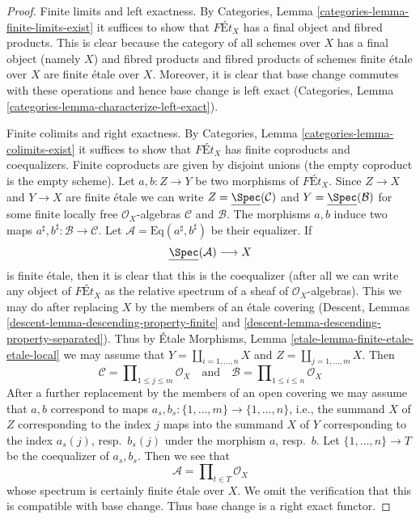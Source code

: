 \begin{proof}
Finite limits and left exactness. By
Categories, Lemma \ref{categories-lemma-finite-limits-exist}
it suffices to show that $\textit{F\'Et}_X$ has a final object
and fibred products. This is clear because the category of
all schemes over $X$ has a final object (namely $X$) and fibred products
and fibred products of schemes finite \'etale over $X$ are
finite \'etale over $X$. Moreover, it is clear that base
change commutes with these operations and hence base change
is left exact (Categories, Lemma
\ref{categories-lemma-characterize-left-exact}).

\medskip\noindent
Finite colimits and right exactness. By
Categories, Lemma \ref{categories-lemma-colimits-exist}
it suffices to show that $\textit{F\'Et}_X$ has finite
coproducts and coequalizers. Finite coproducts are given
by disjoint unions (the empty coproduct is the empty scheme).
Let $a, b : Z \to Y$ be two morphisms of $\textit{F\'Et}_X$.
Since $Z \to X$ and $Y \to X$ are finite \'etale we can write
$Z = \underline{\Spec}(\mathcal{C})$ and $Y = \underline{\Spec}(\mathcal{B})$
for some finite locally free $\mathcal{O}_X$-algebras $\mathcal{C}$
and $\mathcal{B}$. The morphisms $a, b$ induce two maps
$a^\sharp, b^\sharp : \mathcal{B} \to \mathcal{C}$.
Let $\mathcal{A} = \text{Eq}(a^\sharp, b^\sharp)$ be their
equalizer. If
$$
\underline{\Spec}(\mathcal{A}) \longrightarrow X
$$
is finite \'etale, then it is clear that this is the coequalizer
(after all we can write any object of $\textit{F\'Et}_X$
as the relative spectrum of a sheaf of $\mathcal{O}_X$-algebras).
This we may do after replacing $X$ by the members of an \'etale
covering (Descent, Lemmas \ref{descent-lemma-descending-property-finite}
and \ref{descent-lemma-descending-property-separated}).
Thus by \'Etale Morphisms, Lemma \ref{etale-lemma-finite-etale-etale-local}
we may assume that
$Y = \coprod_{i = 1, \ldots, n} X$ and $Z = \coprod_{j = 1, \ldots, m} X$.
Then
$$
\mathcal{C} = \prod\nolimits_{1 \leq j \leq m} \mathcal{O}_X
\quad\text{and}\quad
\mathcal{B} = \prod\nolimits_{1 \leq i \leq n} \mathcal{O}_X
$$
After a further replacement by the members of an open covering
we may assume that $a, b$ correspond to
maps $a_s, b_s : \{1, \ldots, m\} \to \{1, \ldots, n\}$, i.e.,
the summand $X$ of $Z$ corresponding to the index $j$ maps into
the summand $X$ of $Y$ corresponding to the index $a_s(j)$, resp.\ $b_s(j)$
under the morphism $a$, resp.\ $b$.
Let $\{1, \ldots, n\} \to T$ be the coequalizer of $a_s, b_s$.
Then we see that
$$
\mathcal{A} = \prod\nolimits_{t \in T} \mathcal{O}_X
$$
whose spectrum is certainly finite \'etale over $X$. We
omit the verification that this is compatible with base change.
Thus base change is a right exact functor.
\end{proof}

